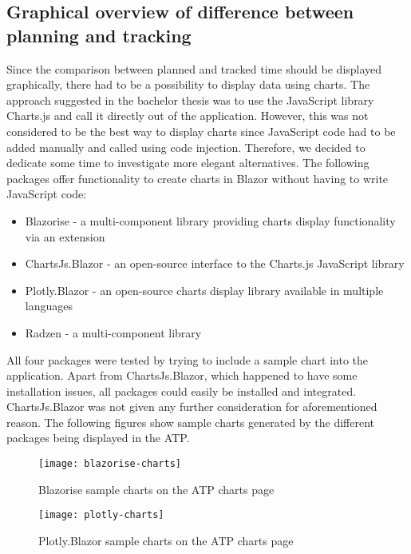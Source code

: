 \subsection{Graphical overview of difference between planning and tracking} \label{Charts}
Since the comparison between planned and tracked time should be displayed graphically, there had to be a possibility to display data using charts. The approach suggested in the bachelor thesis was to use the JavaScript library Charts.js and call it directly out of the application. However, this was not considered to be the best way to display charts since JavaScript code had to be added manually and called using code injection. Therefore, we decided to dedicate some time to investigate more elegant alternatives. The following packages offer functionality to create charts in Blazor without having to write JavaScript code:
\begin{itemize}
	\item Blazorise \cite{blazorise-url} - a multi-component library providing charts display functionality via an extension
	\item ChartsJs.Blazor \cite{chartsjs.blazor-url} - an open-source interface to the Charts.js JavaScript library
	\item Plotly.Blazor \cite{plotly-url} - an open-source charts display library available in multiple languages
	\item Radzen \cite{radzen-url} - a multi-component library
\end{itemize}
All four packages were tested by trying to include a sample chart into the application. Apart from ChartsJs.Blazor, which happened to have some installation issues, all packages could easily be installed and integrated. ChartsJs.Blazor was not given any further consideration for aforementioned reason. The following figures show sample charts generated by the different packages being displayed in the ATP.

\begin{figure}[H]
	\centering
	\texttt{[image: blazorise-charts]}
	\caption{Blazorise sample charts on the ATP charts page}
	\label{blazorise}
\end{figure}

\begin{figure}[H]
	\centering
	\texttt{[image: plotly-charts]}
	\caption{Plotly.Blazor sample charts on the ATP charts page}
	\label{plotly}
\end{figure}

